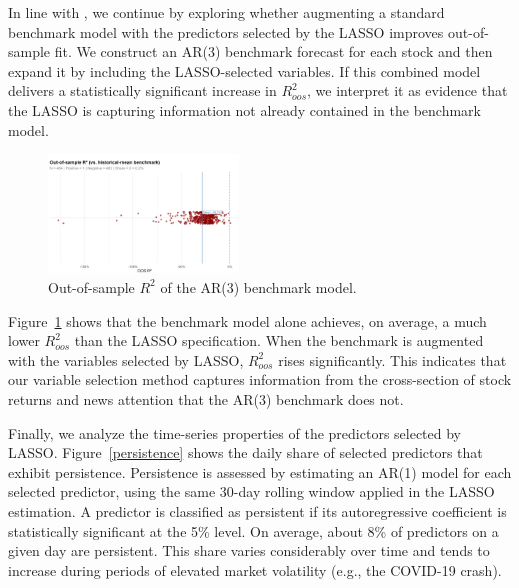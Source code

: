 \documentclass[10pt,twocolumn]{article}
\begin{document}
In line with \cite{chinco2019sparse}, we continue by exploring whether augmenting a standard benchmark model with the predictors selected by the LASSO improves out-of-sample fit. We construct an AR(3) benchmark forecast for each stock and then expand it by including the LASSO-selected variables. If this combined model delivers a statistically significant increase in $R^2_{oos}$, we interpret it as evidence that the LASSO is capturing information not already contained in the benchmark model.

\begin{figure}[h!] %
    \centering
    \includegraphics[width=0.45\textwidth]{r2_oss_ar3.png} 
    \caption{Out-of-sample $R^2$ of the AR(3) benchmark model.}
    \label{fig:r2_oos_benchmark} %
\end{figure}


Figure~\ref{fig:r2_oos_benchmark} shows that the benchmark model alone achieves, on average, a much lower $R^2_{oos}$ than the LASSO specification. When the benchmark is augmented with the variables selected by LASSO, $R^2_{oos}$ rises significantly. This indicates that our variable selection method captures information from the cross-section of stock returns and news attention that the AR(3) benchmark does not.

Finally, we analyze the time-series properties of the predictors selected by LASSO. Figure~\ref{persistence} shows the daily share of selected predictors that exhibit persistence. Persistence is assessed by estimating an AR(1) model for each selected predictor, using the same 30-day rolling window applied in the LASSO estimation. A predictor is classified as persistent if its autoregressive coefficient is statistically significant at the 5\% level. On average, about 8\% of predictors on a given day are persistent. This share varies considerably over time and tends to increase during periods of elevated market volatility (e.g., the COVID-19 crash).
\end{document}
